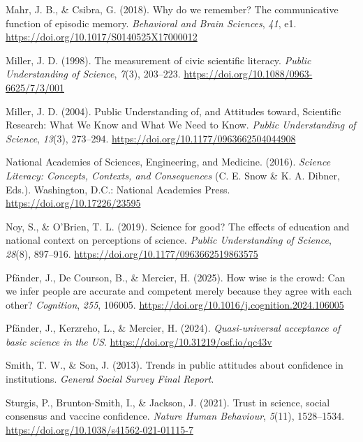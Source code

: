 \documentclass[
  doc,floatsintext]{apa6}
\newlength{\cslhangindent}
\newenvironment{CSLReferences}[2] %
 {\begin{list}{}{%
  \setlength{\itemindent}{0pt}
  \setlength{\leftmargin}{0pt}
  \setlength{\parsep}{0pt}
  \ifodd #1
   \setlength{\leftmargin}{\cslhangindent}
   \setlength{\itemindent}{-1\cslhangindent}
  \fi
  \setlength{\itemsep}{#2\baselineskip}}}
 {\end{list}}
\begin{document}
\begin{CSLReferences}{1}{0}
Mahr, J. B., \& Csibra, G. (2018). Why do we remember? The communicative function of episodic memory. \emph{Behavioral and Brain Sciences}, \emph{41}, e1. \url{https://doi.org/10.1017/S0140525X17000012}

Miller, J. D. (1998). The measurement of civic scientific literacy. \emph{Public Understanding of Science}, \emph{7}(3), 203--223. \url{https://doi.org/10.1088/0963-6625/7/3/001}

Miller, J. D. (2004). Public Understanding of, and Attitudes toward, Scientific Research: What We Know and What We Need to Know. \emph{Public Understanding of Science}, \emph{13}(3), 273--294. \url{https://doi.org/10.1177/0963662504044908}

National Academies of Sciences, Engineering, and Medicine. (2016). \emph{Science Literacy: Concepts, Contexts, and Consequences} (C. E. Snow \& K. A. Dibner, Eds.). Washington, D.C.: National Academies Press. \url{https://doi.org/10.17226/23595}

Noy, S., \& O'Brien, T. L. (2019). Science for good? The effects of education and national context on perceptions of science. \emph{Public Understanding of Science}, \emph{28}(8), 897--916. \url{https://doi.org/10.1177/0963662519863575}

Pfänder, J., De Courson, B., \& Mercier, H. (2025). How wise is the crowd: Can we infer people are accurate and competent merely because they agree with each other? \emph{Cognition}, \emph{255}, 106005. \url{https://doi.org/10.1016/j.cognition.2024.106005}

Pfänder, J., Kerzreho, L., \& Mercier, H. (2024). \emph{Quasi-universal acceptance of basic science in the US}. \url{https://doi.org/10.31219/osf.io/qc43v}

Smith, T. W., \& Son, J. (2013). Trends in public attitudes about confidence in institutions. \emph{General Social Survey Final Report}.

Sturgis, P., Brunton-Smith, I., \& Jackson, J. (2021). Trust in science, social consensus and vaccine confidence. \emph{Nature Human Behaviour}, \emph{5}(11), 1528--1534. \url{https://doi.org/10.1038/s41562-021-01115-7}


\end{CSLReferences}
\end{document}

